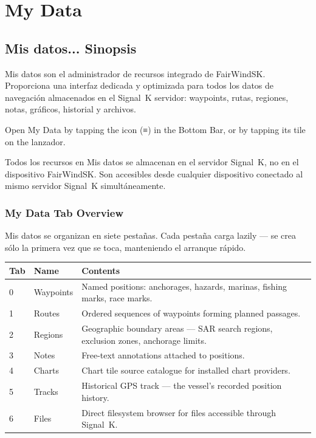 \part{My Data}

\chapter{Mis datos... Sinopsis}
\label{ch:mydata}

Mis datos son el administrador de recursos integrado de FairWindSK.
Proporciona una interfaz dedicada y optimizada para todos los datos de navegación almacenados en el Signal~K
servidor: waypoints, rutas, regiones, notas, gráficos, historial y archivos.

Open My Data by tapping the  icon (≡) in the Bottom Bar, or by tapping its tile on the
lanzador.


\begin{notebox}
Todos los recursos en Mis datos se almacenan en el servidor Signal~K, no en el dispositivo FairWindSK.
Son accesibles desde cualquier dispositivo conectado al mismo servidor Signal~K simultáneamente.
\end{notebox}

\section{My Data Tab Overview}

Mis datos se organizan en siete pestañas.
Cada pestaña carga lazily --- se crea sólo la primera vez que se toca, manteniendo el arranque rápido.

\begin{longtable}{C{0.7cm} L{2.8cm} L{10.2cm}}
\toprule
{}
{\sffamily\bfseries\color{white} Tab} &
{\sffamily\bfseries\color{white} Name} &
{\sffamily\bfseries\color{white} Contents} \\
 & Waypoints & Named positions: anchorages, hazards, marinas, fishing marks, race marks. \\
1 & Routes & Ordered sequences of waypoints forming planned passages. \\
2 & Regions & Geographic boundary areas --- SAR search regions, exclusion zones, anchorage limits. \\
3 & Notes & Free-text annotations attached to positions. \\
4 & Charts & Chart tile source catalogue for installed chart providers. \\
5 & Tracks & Historical GPS track --- the vessel's recorded position history. \\
6 & Files & Direct filesystem browser for files accessible through Signal~K. \\
\bottomrule
\end{longtable}


